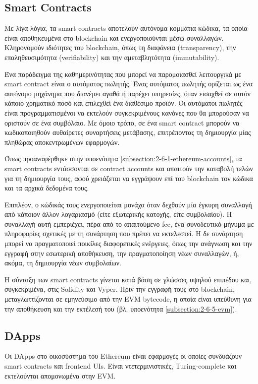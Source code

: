 \subsection{Smart Contracts}
Με λίγα λόγια, τα smart contracts αποτελούν αυτόνομα κομμάτια κώδικα, τα οποία είναι αποθηκευμένα στο blockchain και ενεργοποιούνται μέσω συναλλαγών. Κληρονομούν ιδιότητες του blockchain, όπως τη διαφάνεια (transparency), την επαληθευσιμότητα (verifiability) και την αμεταβλητότητα (immutability).

Ένα παράδειγμα της καθημερινότητας που μπορεί να παρομοιασθεί λειτουργικά με smart contract είναι ο αυτόματος πωλητής.\cite{2.6-ethereum-smart-contracts} Ένας αυτόματος πωλητής ορίζεται ως ένα αυτόνομο μηχάνημα που διανέμει αγαθά ή παρέχει υπηρεσίες, όταν εισαχθεί σε αυτόν κάποιο χρηματικό ποσό και επιλεχθεί ένα διαθέσιμο προϊόν. Οι αυτόματοι πωλητές είναι προγραμματισμένοι να εκτελούν συγκεκριμένους κανόνες που θα μπορούσαν να οριστούν σε ένα συμβόλαιο. Με όμοιο τρόπο, σε ένα smart contract μπορούν να κωδικοποιηθούν αυθαίρετες συναρτήσεις μετάβασης, επιτρέποντας τη δημιουργία μίας πληθώρας αποκεντρωμένων εφαρμογών.

Όπως προαναφέρθηκε στην υποενότητα \ref{subsection:2-6-1-ethereum-accounts}, τα smart contracts εντάσσονται σε contract accounts και απαιτούν την καταβολή τελών για τη δημιουργία τους, αφού χρειάζεται να εγγράψουν επί του blockchain τον κώδικα και τα αρχικά δεδομένα τους.

Επιπλέον, ο κώδικάς τους ενεργοποιείται μονάχα όταν δεχθούν μία έγκυρη συναλλαγή από κάποιον άλλον λογαριασμό (είτε εξωτερικής κατοχής, είτε συμβολαίου). Η συναλλαγή αυτή εμπεριέχει, πέρα από το απαιτούμενο fee, ένα συνοδευτικό μήνυμα με πληροφορίες σχετικές με τη συνάρτηση που πρέπει να εκτελεστεί. Η δε συνάρτηση μπορεί να πραγματοποιεί ποικίλες διαφορετικές ενέργειες, όπως την ανάγνωση και την εγγραφή στην εσωτερική αποθήκευση, την πραγματοποίηση νέων συναλλαγών, ή, ακόμα, τη δημιουργία νέων συμβολαίων.

Η σύνταξη των smart contracts γίνεται κατά βάση σε γλώσσες υψηλού επιπέδου και, συγκεκριμένα, στις Solidity και Vyper. Πριν την εγγραφή τους στο blockchain, μεταγλωττίζονται σε εμηνεύσιμο από την EVM bytecode, η οποία είναι υπεύθυνη για την αποθήκευση και την εκτέλεσή του (βλ. υποενότητα \ref{subsection:2-6-5-evm}).

\subsection{DApps}
Οι DApps στο οικοσύστημα του Ethereum είναι εφαρμογές οι οποίες συνδυάζουν \textenglish{smart contracts} και  \textenglish{frontend UIs}. Είναι ντετερμινιστικές, Turing-complete και εκτελούνται απομονωμένα στην EVM.\cite{2.6-ethereum-documentation}

